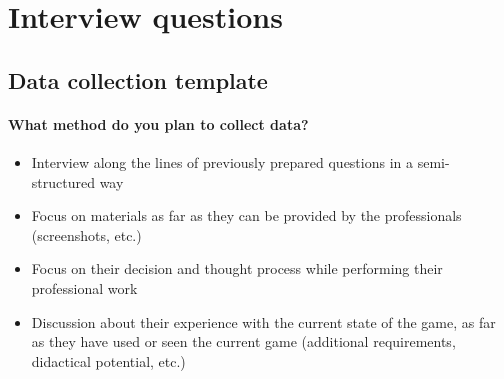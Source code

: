 \section{Interview questions}
\label{sec:appendix_interview_questions}

\subsection{Data collection template}

\paragraph{What method do you plan to collect data?}
\begin{itemize}
  \item Interview along the lines of previously prepared questions in a semi-structured way
  \item Focus on materials as far as they can be provided by the professionals (screenshots, etc.)
  \item Focus on their decision and thought process while performing their professional work
  \item Discussion about their experience with the current state of the game, as far as they have used or seen the current game (additional requirements, didactical potential, etc.)
\end{itemize}

